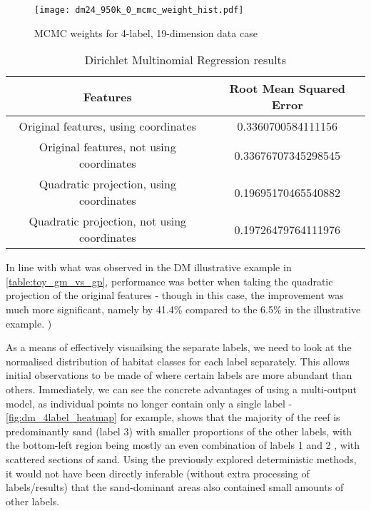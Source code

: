 \begin{figure}[H]
    \centerline{\texttt{[image: dm24\_950k\_0\_mcmc\_weight\_hist.pdf]}}
    \caption{MCMC weights for 4-label, 19-dimension data case }
    \label{fig:24l-mcmc_weights}
\end{figure}

\begin{table}[H]
    \centering
    \begin{tabular}{|c|c|}
        \hline
        Features & Root Mean Squared Error \\\hline
        Original features, using coordinates & 0.3360700584111156 \\
        Original features, not using coordinates & 0.33676707345298545 \\
        Quadratic projection, using coordinates & 0.19695170465540882 \\
        Quadratic projection, not using coordinates & 0.19726479764111976 \\
        \hline
    \end{tabular}
    \label{table:dmbasicresults}
    \caption{Dirichlet Multinomial Regression results}
\end{table}

In line with what was observed in the DM illustrative example in \autoref{table:toy_gm_vs_gp}, performance was better when taking the quadratic projection of the original features - though in this case, the improvement was much more significant, namely by 41.4\% compared to the 6.5\% in the illustrative example. )

As a means of effectively visuailsing the separate labels, we need to look at the normalised distribution of habitat classes for each label separately. This allows initial observations to be made of where certain labels are more abundant than others. Immediately, we can see the concrete advantages of using a multi-output model, as individual points no longer contain only a single label - \autoref{fig:dm_4label_heatmap} for example, shows that the majority of the reef is predominantly sand (label 3) with smaller proportions of the other labels, with the bottom-left region being mostly an even combination of labels 1 and 2 , with scattered sections of sand. Using the previously explored deterministic methods, it would not have been directly inferable (without extra processing of labels/results) that the sand-dominant areas also contained small amounts of other labels.

